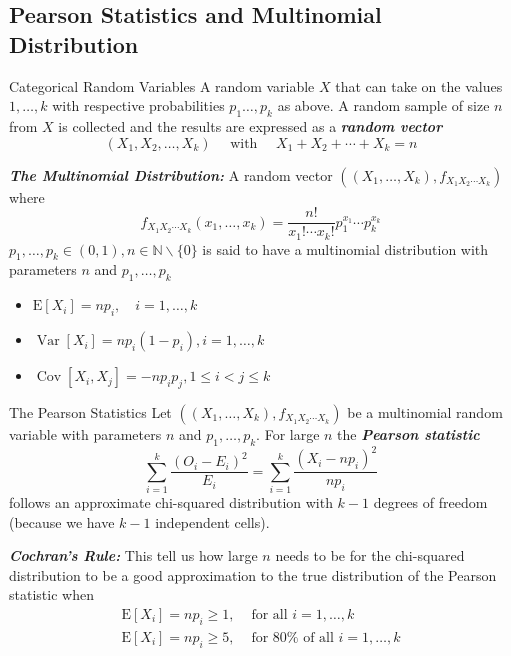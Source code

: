 \documentclass{beamer}
\newcommand{\bb}[1]{\textcolor{antiquefuchsia}{\textbf{\textit{#1}}}}
\begin{document}
\subsection{Pearson Statistics and Multinomial Distribution}
\begin{frame}{Categorical Random Variables}
A random variable $X$ that can take on the values $1, \ldots, k$ with respective probabilities $p_{1} \ldots, p_{k}$ as above. A random sample of size $n$ from $X$ is collected and the results are expressed as a \bb{random vector}
$$
\left(X_{1}, X_{2}, \ldots, X_{k}\right) \quad \text { with } \quad X_{1}+X_{2}+\cdots+X_{k}=n
$$

\bb{The Multinomial Distribution:} A random vector $\left(\left(X_{1}, \ldots, X_{k}\right), f_{X_{1} X_{2} \cdots X_{k}}\right)$ where
$$
f_{X_{1} X_{2} \cdots X_{k}}\left(x_{1}, \ldots, x_{k}\right)=\frac{n !}{x_{1} ! \cdots x_{k} !} p_{1}^{x_{1}} \cdots p_{k}^{x_{k}}
$$
$p_{1}, \ldots, p_{k} \in(0,1), n \in \mathbb{N} \backslash\{0\}$ is said to have a multinomial distribution with parameters $n$ and $p_{1}, \ldots, p_{k}$
\begin{itemize}
\item
$
\mathrm{E}\left[X_{i}\right]=n p_{i}, \quad i=1, \ldots, k
$
\item $\operatorname{Var}\left[X_{i}\right]=n p_{i}\left(1-p_{i}\right), i=1, \ldots, k$
\item $\operatorname{Cov}\left[X_{i}, X_{j}\right]=-n p_{i} p_{j}, 1 \leq i<j \leq k$
\end{itemize}
\end{frame}

\begin{frame}{The Pearson Statistics}
Let $\left(\left(X_{1}, \ldots, X_{k}\right), f_{X_{1} X_{2} \cdots X_{k}}\right)$ be a multinomial random variable with parameters $n$ and $p_{1}, \ldots, p_{k}$. For large $n$ the \bb{Pearson statistic}
$$
\sum_{i=1}^{k} \frac{\left(O_{i}-E_{i}\right)^{2}}{E_{i}}=\sum_{i=1}^{k} \frac{\left(X_{i}-n p_{i}\right)^{2}}{n p_{i}}
$$
follows an approximate chi-squared distribution with $k-1$ degrees of freedom (because we have $k-1$ independent cells).

\bb{Cochran's Rule:} This tell us how large $n$ needs to be for the chi-squared distribution to be a good approximation to the true distribution of the Pearson statistic when
$$
\begin{array}{ll}
\mathrm{E}\left[X_{i}\right]=n p_{i} \geq 1, & \text { for all } i=1, \ldots, k \\
\mathrm{E}\left[X_{i}\right]=n p_{i} \geq 5, & \text { for } 80 \% \text { of all } i=1, \ldots, k
\end{array}
$$
\end{frame}
\end{document}
